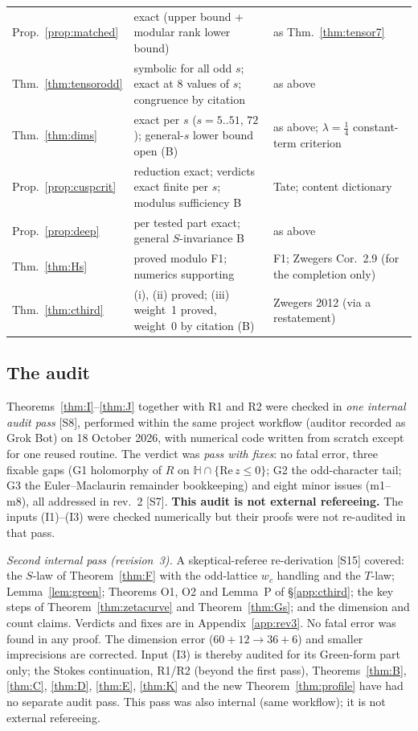 \documentclass[11pt]{article}
\theoremstyle{definition}
\newcommand{\Hb}{\mathbb{H}}
\newcommand{\src}[1]{\textup{[S#1]}}
\begin{document}
\begin{center}
\begin{longtable}{p{2.6cm}p{6.6cm}p{5.6cm}}
Prop.~\ref{prop:matched} & exact (upper bound + modular rank lower bound) & as Thm.~\ref{thm:tensor7}\\
Thm.~\ref{thm:tensorodd} & symbolic for all odd $s$; exact at $8$ values of $s$; congruence by citation & as above\\
Thm.~\ref{thm:dims} & exact per $s$ ($s=5..51$, $72$); general-$s$ lower bound open (B) & as above; $\lambda=\tfrac14$ constant-term criterion\\
Prop.~\ref{prop:cuspcrit} & reduction exact; verdicts exact finite per $s$; modulus sufficiency B & Tate; content dictionary\\
Prop.~\ref{prop:deep} & per tested part exact; general $S$-invariance B & as above\\
Thm.~\ref{thm:Hs} & proved modulo F1; numerics supporting & F1; Zwegers Cor.~2.9 (for the completion only)\\
Thm.~\ref{thm:cthird} & (i), (ii) proved; (iii) weight~1 proved, weight~0 by citation (B) & Zwegers 2012 (via a restatement)\\\bottomrule
\end{longtable}
\end{center}

\subsection{The audit}\label{sec:audit}
Theorems~\ref{thm:I}--\ref{thm:J} together with R1 and R2 were checked in \emph{one internal audit pass} \src{8}, performed within the same project
workflow (auditor recorded as Grok Bot) on 18 October 2026, with numerical code written from scratch except for one reused routine. The verdict was
\emph{pass with fixes}: no fatal error, three fixable gaps (G1 holomorphy of $R$ on $\Hb\cap\{\mathrm{Re}\,z\le0\}$; G2 the odd-character tail; G3
the Euler--Maclaurin remainder bookkeeping) and eight minor issues (m1--m8), all addressed in rev.~2 \src{7}. \textbf{This audit is not external
refereeing.} The inputs (I1)--(I3) were checked numerically but their proofs were not re-audited in that pass.

\emph{Second internal pass (revision~3).} A skeptical-referee re-derivation \src{15} covered: the $S$-law of Theorem~\ref{thm:F} with the odd-lattice
$w_c$ handling and the $T$-law; Lemma~\ref{lem:green}; Theorems O1, O2 and Lemma~P of \S\ref{app:cthird}; the key steps of
Theorem~\ref{thm:zetacurve} and Theorem~\ref{thm:Gs}; and the dimension and count claims. Verdicts and fixes are in Appendix~\ref{app:rev3}. No fatal
error was found in any proof. The dimension error ($60+12\to36+6$) and smaller imprecisions are corrected. Input (I3) is thereby audited for its Green-form part
only; the Stokes continuation, R1/R2 (beyond the first pass), Theorems~\ref{thm:B}, \ref{thm:C}, \ref{thm:D}, \ref{thm:E}, \ref{thm:K} and the new
Theorem~\ref{thm:profile} have had no separate audit pass. This pass was also internal (same workflow); it is not external refereeing.
\end{document}
